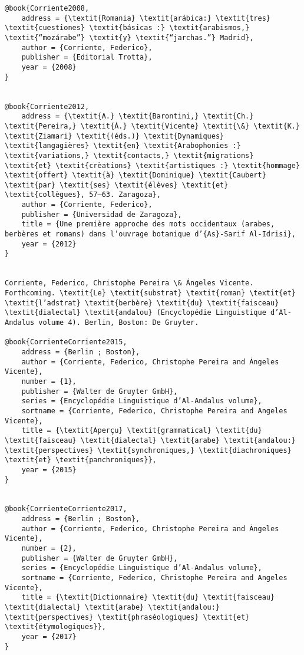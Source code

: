 \documentclass[output=paper,modfonts,nonflat]{langsci/langscibook}
\begin{document}
\begin{verbatim}
@book{Corriente2008,
	address = {\textit{Romania} \textit{arábica:} \textit{tres} \textit{cuestiones} \textit{básicas :} \textit{arabismos,} \textit{“mozárabe”} \textit{y} \textit{“jarchas.”} Madrid},
	author = {Corriente, Federico},
	publisher = {Editorial Trotta},
	year = {2008}
}


@book{Corriente2012,
	address = {\textit{A.} \textit{Barontini,} \textit{Ch.} \textit{Pereira,} \textit{Á.} \textit{Vicente} \textit{\&} \textit{K.} \textit{Ziamari} \textit{(éds.)} \textit{Dynamiques} \textit{langagières} \textit{en} \textit{Arabophonies :} \textit{variations,} \textit{contacts,} \textit{migrations} \textit{et} \textit{crèations} \textit{artistiques :} \textit{hommage} \textit{offert} \textit{à} \textit{Dominique} \textit{Caubert} \textit{par} \textit{ses} \textit{élèves} \textit{et} \textit{collègues}, 57–63. Zaragoza},
	author = {Corriente, Federico},
	publisher = {Universidad de Zaragoza},
	title = {Une première approche des mots occidentaux (arabes, berbères et romans) dans l’ouvrage botanique d’{As}-Sarif Al-Idrisi},
	year = {2012}
}


Corriente, Federico, Christophe Pereira \& Ángeles Vicente. Forthcoming. \textit{Le} \textit{substrat} \textit{roman} \textit{et} \textit{l’adstrat} \textit{berbère} \textit{du} \textit{faisceau} \textit{dialectal} \textit{andalou} (Encyclopédie Linguistique d’Al-Andalus volume 4). Berlin, Boston: De Gruyter.

@book{CorrienteCorriente2015,
	address = {Berlin ; Boston},
	author = {Corriente, Federico, Christophe Pereira and Ángeles Vicente},
	number = {1},
	publisher = {Walter de Gruyter GmbH},
	series = {Encyclopédie Linguistique d’Al-Andalus volume},
	sortname = {Corriente, Federico, Christophe Pereira and Angeles Vicente},
	title = {\textit{Aperçu} \textit{grammatical} \textit{du} \textit{faisceau} \textit{dialectal} \textit{arabe} \textit{andalou:} \textit{perspectives} \textit{synchroniques,} \textit{diachroniques} \textit{et} \textit{panchroniques}},
	year = {2015}
}


@book{CorrienteCorriente2017,
	address = {Berlin ; Boston},
	author = {Corriente, Federico, Christophe Pereira and Ángeles Vicente},
	number = {2},
	publisher = {Walter de Gruyter GmbH},
	series = {Encyclopédie Linguistique d’Al-Andalus volume},
	sortname = {Corriente, Federico, Christophe Pereira and Angeles Vicente},
	title = {\textit{Dictionnaire} \textit{du} \textit{faisceau} \textit{dialectal} \textit{arabe} \textit{andalou:} \textit{perspectives} \textit{phraséologiques} \textit{et} \textit{étymologiques}},
	year = {2017}
}



\end{verbatim}
\end{document}
